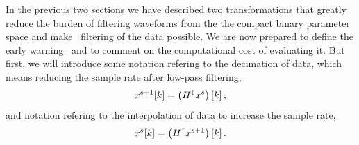 In the previous two sections we have described two transformations that greatly
reduce the burden of filtering waveforms from the the compact binary parameter space and make \TD\
filtering of the data possible.  We are now prepared to define the early
warning \SNR\ and to comment on the computational cost of evaluating it.  But
first, we will introduce some notation refering to the decimation of data,
which means reducing the sample rate after low-pass filtering,
\begin{equation}
\label{eq:decomp}
	x^{s+1}[k] = \left( H^\shortdownarrow x^s\right)[k] \,,
\end{equation}
and notation refering to the interpolation of data to increase the sample rate,
\begin{equation}
	x^{s}[k] = \left( H^\shortuparrow x^{s+1}\right)[k] \,.
\end{equation}

